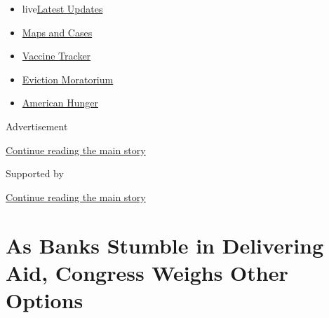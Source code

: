 \begin{itemize}
\tightlist
\item
  live\href{https://www.nytimes3xbfgragh.onion/2020/09/08/world/covid-19-coronavirus.html?name=styln-coronavirus-markets\&region=TOP_BANNER\&block=storyline_menu_recirc\&action=click\&pgtype=Article\&impression_id=ae7b0e50-f27f-11ea-8789-45ae9f4c38e2\&variant=undefined}{Latest
  Updates}
\item
  \href{https://www.nytimes3xbfgragh.onion/interactive/2020/us/coronavirus-us-cases.html?name=styln-coronavirus-markets\&region=TOP_BANNER\&block=storyline_menu_recirc\&action=click\&pgtype=Article\&impression_id=ae7b0e51-f27f-11ea-8789-45ae9f4c38e2\&variant=undefined}{Maps
  and Cases}
\item
  \href{https://www.nytimes3xbfgragh.onion/interactive/2020/science/coronavirus-vaccine-tracker.html?name=styln-coronavirus-markets\&region=TOP_BANNER\&block=storyline_menu_recirc\&action=click\&pgtype=Article\&impression_id=ae7b0e52-f27f-11ea-8789-45ae9f4c38e2\&variant=undefined}{Vaccine
  Tracker}
\item
  \href{https://www.nytimes3xbfgragh.onion/2020/09/02/your-money/eviction-moratorium-covid.html?name=styln-coronavirus-markets\&region=TOP_BANNER\&block=storyline_menu_recirc\&action=click\&pgtype=Article\&impression_id=ae7b0e53-f27f-11ea-8789-45ae9f4c38e2\&variant=undefined}{Eviction
  Moratorium}
\item
  \href{https://www.nytimes3xbfgragh.onion/interactive/2020/09/02/magazine/food-insecurity-hunger-us.html?name=styln-coronavirus-markets\&region=TOP_BANNER\&block=storyline_menu_recirc\&action=click\&pgtype=Article\&impression_id=ae7b0e54-f27f-11ea-8789-45ae9f4c38e2\&variant=undefined}{American
  Hunger}
\end{itemize}

Advertisement

\protect\hyperlink{after-top}{Continue reading the main story}

Supported by

\protect\hyperlink{after-sponsor}{Continue reading the main story}

\hypertarget{as-banks-stumble-in-delivering-aid-congress-weighs-other-options}{%
\section{As Banks Stumble in Delivering Aid, Congress Weighs Other
Options}\label{as-banks-stumble-in-delivering-aid-congress-weighs-other-options}}

